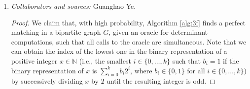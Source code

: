 \documentclass[letterpaper, reqno,11pt]{article}
\newcommand{\NN}{\mathbb{N}}
\DeclareMathOperator{\sign}{sign}
\begin{document}
\begin{enumerate}
\begin{enumerate}
\begin{proof}
\begin{itemize}[itemsep=0pt]
\begin{align*}
        \end{align*}
        Since $\det A' \neq 0$ and since weights are non-negative integers, then
        \begin{equation} \label{eq:3e-odd}
          \left|\sign\left(\sigma_1\right) + \sum_{i = 2}^\ell \sign\left(\sigma_i\right) 2^{w\left(M_{\sigma_i}\right) - w\left(M_{\sigma_1}\right)}\right|
        \end{equation}
        is at least $1$. Suppose that the binary representation of \eqref{eq:3e-odd} is $\sum_{i = 0}^{k'} \beta_i 2^i$, where $\beta_i \in \{ 0, 1 \}$ for all $i \in \{ 0, \ldots, k' \}$, and there exists $i \in \{ 0, \ldots, k' \}$ with $\beta_i = 1$. Hence,
        $$ \left|\det A'\right| = 2^{w'} \left(\sum_{i = 0}^{k'} \beta_i 2^i\right) = \sum_{i = 0}^{k'} \beta_i 2^{w' + i}. $$
        By the uniqueness of binary representations, we have $j^* \geq w' > w^* = i^*$.
      \end{itemize}
      
      In other words, we have shown that an edge $e \in E$ is not contained in the (unique) minimum weight perfect matching of $G$ if and only if $\det A' \neq 0$ and $i^* = j^*$ (as defined in Algorithm \ref{alg:specific-edge}). This justifies Algorithm \ref{alg:specific-edge}, completing the proof.
    \end{proof}

    \clearpage

    \item \noindent\emph{Collaborators and sources:} Guanghao Ye.

    \bigskip

    \begin{proof}
      We claim that, with high probability, Algorithm \ref{alg:3f} finds a perfect matching in a bipartite graph $G$, given an oracle for determinant computations, such that all calls to the oracle are simultaneous. Note that we can obtain the index of the lowest one in the binary representation of a positive integer $x \in \NN$ (i.e., the smallest $i \in \{ 0, \ldots, k \}$ such that $b_i = 1$ if the binary representation of $x$ is $\sum_{i = 0}^k b_i 2^i$, where $b_i \in \{ 0, 1 \}$ for all $i \in \{ 0, \ldots, k \}$) by successively dividing $x$ by $2$ until the resulting integer is odd.


\end{proof}
\end{enumerate}
\end{enumerate}
\end{document}
